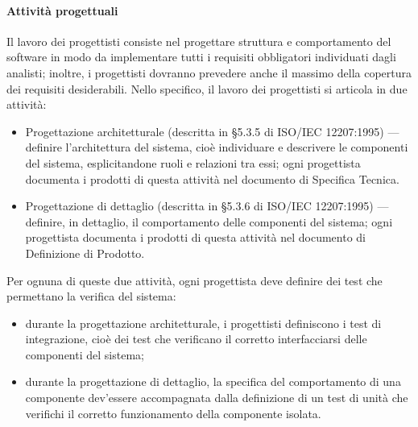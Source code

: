 	\paragraph{Attività progettuali} Il lavoro dei progettisti consiste nel progettare
struttura e comportamento del software in modo da implementare tutti i requisiti
obbligatori individuati dagli analisti; inoltre, i progettisti dovranno prevedere
anche il massimo della copertura dei requisiti desiderabili. Nello specifico, il lavoro dei progettisti si articola in due
attività:
\begin{itemize}
\item Progettazione architetturale (descritta in §5.3.5 di ISO/IEC 12207:1995)
— definire l’architettura del sistema, cioè individuare e descrivere le componenti
del sistema, esplicitandone ruoli e relazioni tra essi; ogni progettista
documenta i prodotti di questa attività nel documento di Specifica Tecnica.
\item Progettazione di dettaglio (descritta in §5.3.6 di ISO/IEC 12207:1995)
— definire, in dettaglio, il comportamento delle componenti del sistema;
ogni progettista documenta i prodotti di questa attività nel documento di
Definizione di Prodotto.
\end{itemize}
Per ognuna di queste due attività, ogni progettista deve definire dei test che
permettano la verifica del sistema:
\begin{itemize}
\item durante la progettazione architetturale, i progettisti definiscono i test di
integrazione, cioè dei test che verificano il corretto interfacciarsi delle
componenti del sistema;
\item durante la progettazione di dettaglio, la specifica del comportamento di
una componente dev’essere accompagnata dalla definizione di un test di
unità che verifichi il corretto funzionamento della componente isolata.

\end{itemize}
